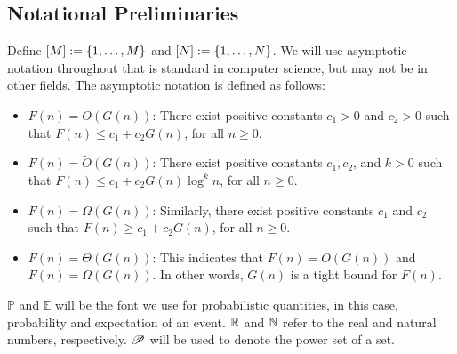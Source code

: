 \subsection{Notational Preliminaries}
\label{ss:results-notation}
Define $[M] := \{1,\dots, M\}$ and $[N] := \{1,\dots,N\}$.
We will use asymptotic notation throughout that is standard in computer science, but may not be in other fields.
The asymptotic notation is defined as follows:
\begin{itemize}[itemsep=1em]
    \item $F(n) = O(G(n))$: There exist positive constants $c_1 > 0$ and $c_2 > 0$ such that $F(n) \leq c_1 + c_2G(n)$, for all $n \geq 0$.
    \item $F(n) = \tilde{O}(G(n))$: There exist positive constants $c_1, c_2$, and $k > 0$ such that $F(n) \leq c_1 + c_2 G(n) \log^k n$, for all $n \geq 0$.
    \item $F(n) = \Omega(G(n))$: Similarly, there exist positive constants $c_1$ and $c_2$ such that $F(n) \geq c_1 + c_2G(n)$, for all $n \geq 0$.
    \item $F(n) = \Theta(G(n))$: This indicates that $F(n) = O(G(n))$ and $F(n) = \Omega(G(n))$.
    In other words, $G(n)$ is a tight bound for $F(n)$.
\end{itemize}
$\mathbb{P}$ and $\mathbb{E}$ will be the font we use for probabilistic quantities, in this case, probability and expectation of an event.
$\mathbb{R}$ and $\mathbb{N}$ refer to the real and natural numbers, respectively.
$\mathscr{P}$ will be used to denote the power set of a set.

